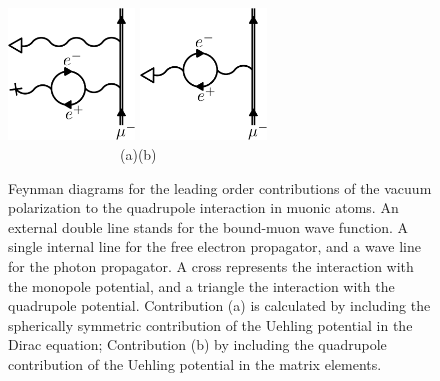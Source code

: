\begin{figure}%
\centering
\includegraphics[width=0.30\textwidth]{pics/mixed}\hspace{3.5cm}
\includegraphics[width=0.30\textwidth]{pics/quehl}\\
$\qquad\qquad\qquad\qquad$(a)\hfill(b)$\qquad\qquad\qquad\qquad$
\caption{
Feynman diagrams for the leading order contributions of the vacuum polarization to the quadrupole interaction in muonic atoms. An external double line stands for the bound-muon wave function. A single internal line for the free electron propagator, and a wave line for the photon propagator. A cross represents the interaction with the monopole potential, and a triangle the interaction with the quadrupole potential. Contribution (a) is calculated by including the spherically symmetric contribution of the Uehling potential in the Dirac equation; Contribution (b) by including the quadrupole contribution of the Uehling potential in the matrix elements.
}
\label{fig:quehl}
\end{figure}

